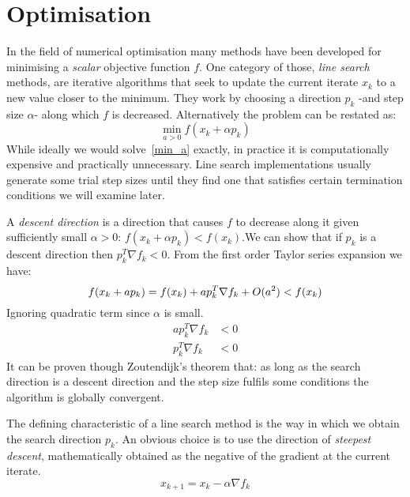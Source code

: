 \documentclass{article}
\begin{document}
    \section{Optimisation}
    In the field of numerical optimisation many methods have been developed for minimising a \textit{scalar} objective function $f$.
    One category of those, \textit{line search} methods, are iterative algorithms that seek to update the current iterate $x_k$ to a new value closer to the minimum.
    They work by choosing a direction $p_k$ -and step size $\alpha$- along which $f$ is decreased.
    Alternatively the problem can be restated as:
    \begin{equation}
        \min_{a>0} f(x_k + \alpha p_k) \label{min_a}
    \end{equation}
    While ideally we would solve~\eqref{min_a} exactly, in practice it is computationally expensive and practically unnecessary.
    Line search implementations usually generate some trial step sizes until they find one that satisfies certain termination conditions we will examine later.

    A \textit{descent direction} is a direction that causes $f$ to decrease along it given sufficiently small $\alpha > 0$: $f(x_k + \alpha p_k) < f(x_k)$.We can show that if $p_k$ is a descent direction then $p_k^T \nabla f_k < 0$.
    From the first order Taylor series expansion we have:
    \begin{equation*}
        f(x_k+ap_k) = f(x_k) + a p_k^T \nabla f_k + O(a^2)< f(x_k) \\
    \end{equation*}
    Ignoring quadratic term since $\alpha$ is small.
    \begin{align*}
        a p_k^T \nabla f_k &< 0 \\
        p_k^T \nabla f_k &< 0
    \end{align*}
    It can be proven though Zoutendijk's theorem that: as long as the search direction is a descent direction and the step size fulfils some conditions the algorithm is globally convergent.

    The defining characteristic of a line search method is the way in which we obtain the search direction $p_k$.
    An obvious choice is to use the direction of \textit{steepest descent}, mathematically obtained as the negative of the gradient at the current iterate.
    \begin{equation}
        x_{k+1} = x_k - \alpha \nabla f_k
    \end{equation}
\end{document}

